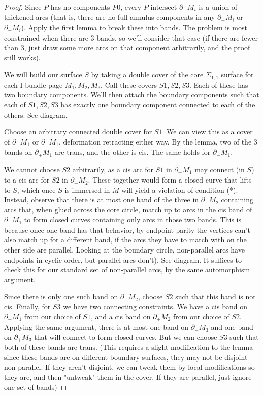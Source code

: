 \documentclass[12pt]{amsart}
\theoremstyle{definition}
\newcommand{\bd}{\partial}
\newcommand{\Si}{\Sigma}
\begin{document}
\begin{proof}

Since $P$ has no components $P0$, every $P$ intersect $\bd_+M_i$ is a union of thickened
arcs (that is, there are no full annulus components in any $\bd_+M_i$ or $\bd_-M_i$). Apply
the first lemma to break these into bands. The problem is most constrained when
there are 3 bands, so we'll consider that case (if there are fewer than 3, just
draw some more arcs on that component arbitrarily, and the proof still works).

We will build our surface $S$ by taking a double cover of the core $\Si_{1,1}$ surface
for each I-bundle page $M_1,M_2,M_3$. Call these covers $S1,S2,S3$. Each of these has
two boundary components. We'll then attach the boundary components such that
each of $S1,S2,S3$ has exactly one boundary component connected to each of the
others. See diagram.

Choose an arbitrary connected double cover for $S1$. We can view this as a cover
of $\bd_+M_1$ or $\bd_-M_1$, deformation retracting either way. By the lemma, two of the
3 bands on $\bd_+M_1$ are trans, and the other is cis. The same holds for $\bd_-M_1$.

We cannot choose $S2$ arbitrarily, as a cis arc for $S1$ in $\bd_+M_1$ may connect
(in $S$)
to a cis arc for $S2$ in $\bd_-M_2$. These together would form a closed curve that
lifts to $S$, which once $S$ is immersed in $M$ will yield a violation of condition
(*). Instead, observe that there is at most one band of the three in $\bd_-M_2$
containing arcs that, when glued across the core circle, match up to arcs in
the cis band of $\bd_+M_1$ to form closed curves containing only arcs in those two
bands. This is because once one band has that behavior, by endpoint parity the
vertices can't also match up for a different band, if the arcs they have to
match with on the other side are parallel. Looking at the boundary circle,
non-parallel arcs have endpoints in cyclic order, but parallel arcs don't). See
diagram. It suffices to check this for our standard set of non-parallel arcs,
by the same automorphism argument.

Since there is only one such band on $\bd_-M_2$, choose $S2$ such that this band is not
cis.  Finally, for $S3$ we have two connecting constraints. We have a cis band on
$\bd_-M_1$ from our choice of $S1$, and a cis band on $\bd_+M_2$ from our choice of
$S2$.
Applying the same argument, there is at most one band on $\bd_-M_3$ and one band on
$\bd_+M_3$ that will connect to form closed curves. But we can choose $S3$ such that
both of these bands are trans. (This requires a slight modification to the
lemma - since these bands are on different boundary surfaces, they may not be
disjoint non-parallel. If they aren't disjoint, we can tweak them by local
modifications so they are, and then "untweak" them in the cover. If they are
parallel, just ignore one set of bands)


\end{proof}
\end{document}
